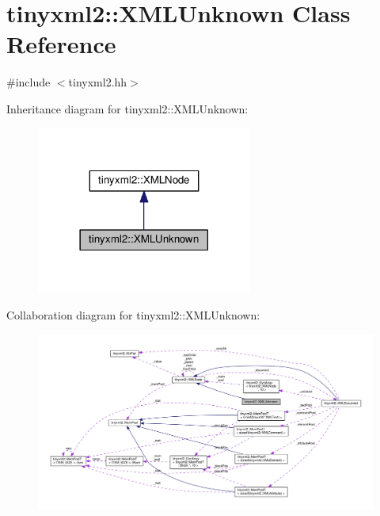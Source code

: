 \hypertarget{classtinyxml2_1_1XMLUnknown}{}\section{tinyxml2\+:\+:X\+M\+L\+Unknown Class Reference}
\label{classtinyxml2_1_1XMLUnknown}


{\ttfamily \#include $<$tinyxml2.\+hh$>$}



Inheritance diagram for tinyxml2\+:\+:X\+M\+L\+Unknown\+:
\nopagebreak
\begin{figure}[H]
\begin{center}
\leavevmode
\includegraphics[width=201pt]{classtinyxml2_1_1XMLUnknown__inherit__graph}
\end{center}
\end{figure}


Collaboration diagram for tinyxml2\+:\+:X\+M\+L\+Unknown\+:
\nopagebreak
\begin{figure}[H]
\begin{center}
\leavevmode
\includegraphics[width=350pt]{classtinyxml2_1_1XMLUnknown__coll__graph}
\end{center}
\end{figure}
